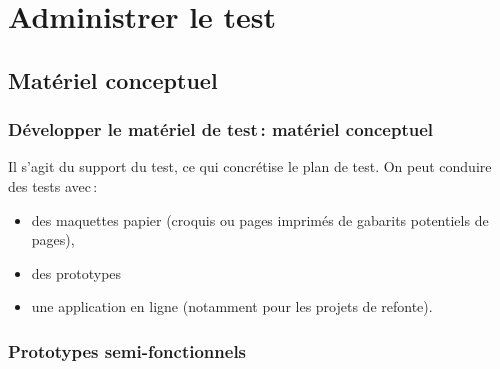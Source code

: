 	

		       
	
	\section{Administrer le test} 
		    
		
	\subsection{Matériel conceptuel } 
		
		\begin{frame}[allowframebreaks]
		\frametitle{Développer le matériel de test\,: matériel conceptuel \citep{ergolab2014a}}
		 Il s'agit du support du test, ce qui concrétise le plan de test.
		 On peut conduire des tests avec\,:
			\begin {itemize}
				      \item des maquettes papier (croquis ou pages imprimés de gabarits potentiels de pages), 
				      \item des prototypes
				      \item une application en ligne (notamment pour les projets de refonte). 
				   
			\end{itemize}
		\end{frame}   	
		
		
		\subsubsection{Prototypes semi-fonctionnels} 
		 
